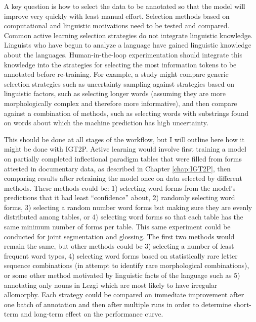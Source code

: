 A key question is how to select the data to be annotated so that the model will improve very quickly with least manual effort. Selection methods based on computational and linguistic motivations need to be tested and compared. 
Common active learning selection strategies do not integrate linguistic knowledge. %
Linguists who have begun to analyze a language have gained linguistic knowledge about the languages. Human-in-the-loop experimentation should integrate this knowledge into the strategies for selecting the most information tokens to be annotated before re-training. For example, a study might compare generic selection strategies such as uncertainty sampling against strategies based on linguistic factors, such as selecting longer words (assuming they are more morphologically complex and therefore more informative), and then compare against a combination of methods, such as selecting words with substrings found on words about which the machine prediction has high uncertainty.

This should be done at all stages of the workflow, but I will outline here how it might be done with IGT2P.
Active learning would involve first training a model on partially completed inflectional paradigm tables that were filled from forms attested in documentary data, as described in Chapter \ref{chap:IGT2P}, then comparing results after retraining the model once on data selected by different methods. These methods could be: 1) selecting word forms from the model’s predictions that it had least ``confidence'' about, 2) randomly selecting word forms, 3) selecting a random number word forms but making sure they are evenly distributed among tables, or 4) selecting word forms so that each table has the same minimum number of forms per table. This same experiment could be conducted for joint segmentation and glossing. The first two methods would remain the same, but other methods could be 3) selecting a number of least frequent word types, 4) selecting word forms based on statistically rare letter sequence combinations (in attempt to identify rare morphological combinations), or some other method motivated by linguistic facts of the language such as 5) annotating only nouns in Lezgi which are most likely to have irregular allomorphy. Each strategy could be compared on immediate improvement after one batch of annotation and then after multiple runs in order to determine short-term and long-term effect on the performance curve. 

